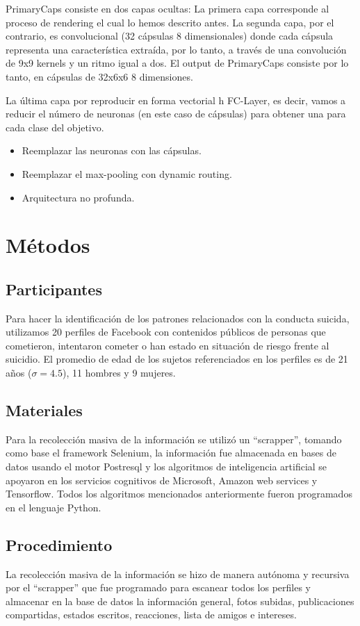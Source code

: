 \documentclass[12pt, donotrepeattitle, jou]{apa6}
\begin{document}
    PrimaryCaps consiste en dos capas ocultas: La primera capa corresponde al proceso de rendering el cual lo hemos descrito antes. La segunda capa, por el contrario, es convolucional (32 cápsulas 8 dimensionales) donde cada cápsula representa una característica extraída, por lo tanto, a través de una convolución de 9x9 kernels y un ritmo igual a dos. El output de PrimaryCaps consiste por lo tanto, en cápsulas de 32x6x6 8 dimensiones.

    La última capa por reproducir en forma vectorial h FC-Layer, es decir, vamos a reducir el número de neuronas (en este caso de cápsulas) para obtener una para cada clase del objetivo\parencite{Capsules4}.

    \begin{itemize}
        \item Reemplazar las neuronas con las cápsulas.
        \item Reemplazar el max-pooling con dynamic routing.
        \item Arquitectura no profunda.
    \end{itemize}

    \section{Métodos}
    \subsection{Participantes}
    Para hacer la identificación de los patrones relacionados con la conducta suicida, utilizamos 20 perfiles de Facebook con contenidos públicos de personas que cometieron, intentaron cometer o han estado en situación de riesgo frente al suicidio. El promedio de edad de los sujetos referenciados en los perfiles es de 21 años ($\sigma = 4.5$), 11 hombres y 9 mujeres.
    
    \subsection{Materiales}
    Para la recolección masiva de la información se utilizó un ``scrapper'', tomando como base el framework Selenium, la información fue almacenada en bases de datos usando el motor Postresql y los algoritmos de inteligencia artificial se apoyaron en los servicios cognitivos de Microsoft, Amazon web services y Tensorflow. Todos los algoritmos mencionados anteriormente fueron programados en el lenguaje Python.
    
    \subsection{Procedimiento}
    La recolección masiva de la información se hizo de manera autónoma y recursiva por el ``scrapper'' que fue programado para escanear todos los perfiles y almacenar en la base de datos la información general, fotos subidas, publicaciones compartidas, estados escritos, reacciones, lista de amigos e intereses.
    
\end{document}
